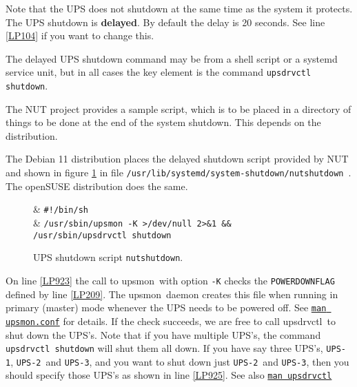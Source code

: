 \documentclass[12pt]{article}
\newcommand{\upsdrvctl}{\mbox{\textcolor{UPSDCOLOUR}{upsdrvctl}}}
\newcommand{\upsmon}{\mbox{\textcolor{MONCOLOUR}{upsmon}}}
\newcommand{\UPSi}{\texttt{UPS-1}}
\newcommand{\UPSii}{\texttt{UPS-2}}
\newcommand{\UPSiii}{\texttt{UPS-3}}
\newcommand{\nutshutdown}{\textcolor{NUTCOLOUR}{\texttt{nutshutdown}}}
\newcommand{\NUTman}[1]{\href{https://networkupstools.org/docs/man/#1.html}{\texttt{man #1}}}
\newcommand{\refpage}[1]{\ref{#1}}
\begin{document}
Note that the UPS does not shutdown at the same time as the system it
protects.  The UPS shutdown is \textbf{delayed}.  By default the delay is 20
seconds.  See line \refpage{LP104} if you want to change this.

The delayed UPS shutdown command may be from a shell script or a systemd
service unit, but in all cases the key element is the command
\texttt{upsdrvctl shutdown}.

The NUT project provides a sample script, which is to be placed in a directory
of things to be done at the end of the system shutdown.  This depends on the
distribution.  

The Debian 11 distribution places the delayed shutdown script provided by NUT
and shown in figure \ref{fig:delayedUPSshutdown.script} in file
\texttt{/usr{\allowbreak}/lib{\allowbreak}/systemd{\allowbreak}/system-shutdown{\allowbreak}/nutshutdown}\ .
The openSUSE distribution does the same.

\begin{figure}[ht]
\begin{center}
\begin{LinePrinter}[0.95\LinePrinterwidth]
\Clunk[LP922]  & \verb`#!/bin/sh` \\
\Clunk[LP923]  & \verb`/usr/sbin/upsmon -K >/dev/null 2>&1 && /usr/sbin/upsdrvctl shutdown` \\
\end{LinePrinter}
\end{center}
\vspace{-6mm}
\caption{UPS shutdown script \nutshutdown.\label{fig:delayedUPSshutdown.script}}
\end{figure}

On line \ref{LP923} the call to \upsmon\ with option \texttt{-K} checks the
\texttt{POWERDOWNFLAG} defined by line \ref{LP209}.  The \upsmon\ daemon
creates this file when running in primary (master) mode whenever the UPS needs
to be powered off.  See \NUTman{upsmon.conf} for details.  If the check
succeeds, we are free to call \upsdrvctl\ to shut down the UPS's.  Note that
if you have multiple UPS's, the command \texttt{ upsdrvctl shutdown} will shut
them all down.  If you have say three UPS's, \UPSi, \UPSii\ and \UPSiii, and
you want to shut down just \UPSii\ and \UPSiii, then you should specify those
UPS's as shown in line \ref{LP925}.  See also \NUTman{upsdrvctl}
\end{document}
